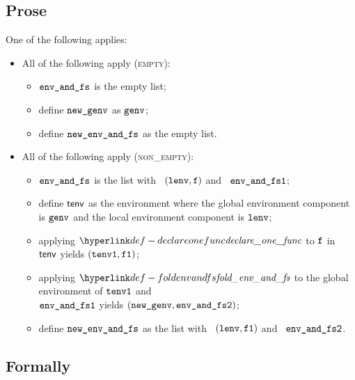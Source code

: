 \subsection{Prose}
One of the following applies:
\begin{itemize}
  \item All of the following apply (\textsc{empty}):
  \begin{itemize}
    \item $\texttt{env\_and\_fs}$ is the empty list;
    \item define $\texttt{new\_genv}$ as $\texttt{genv}$;
    \item define $\texttt{new\_env\_and\_fs}$ as the empty list.
  \end{itemize}

  \item All of the following apply (\textsc{non\_empty}):
  \begin{itemize}
    \item $\texttt{env\_and\_fs}$ is the list with \head\ $(\texttt{lenv}, \texttt{f})$ and \tail\ $\texttt{env\_and\_fs1}$;
    \item define $\textsf{tenv}$ as the environment where the global environment component is $\texttt{genv}$ and the local environment component is $\texttt{lenv}$;
    \item applying $\declareonefunc$ to $\texttt{f}$ in $\textsf{tenv}$ yields $(\texttt{tenv1}, \texttt{f1})$\ProseOrTypeError;
    \item applying $\foldenvandfs$ to the global environment of $\texttt{tenv1}$ and \\
          $\texttt{env\_and\_fs1}$ yields $(\texttt{new\_genv}, \texttt{env\_and\_fs2})$\ProseOrTypeError;
    \item define $\texttt{new\_env\_and\_fs}$ as the list with \head\ $(\texttt{lenv}, \texttt{f1})$ and \tail\ $\texttt{env\_and\_fs2}$.
  \end{itemize}
\end{itemize}

\subsection{Formally}


